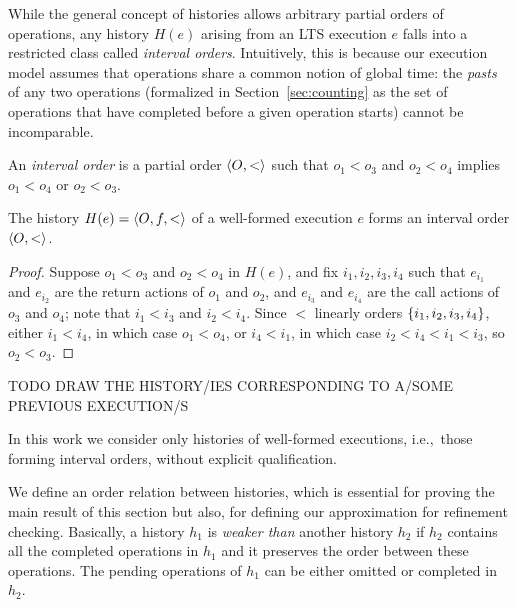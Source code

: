 While the general concept of histories allows arbitrary partial orders of
operations, any history $H(e)$ arising from an LTS execution $e$ falls into a
restricted class called \emph{interval orders}. Intuitively, this is because
our execution model assumes that operations share a common notion of global
time: the \emph{pasts} of any two operations (formalized in
Section~\ref{sec:counting} as the set of operations that have completed before
a given operation starts) cannot be incomparable.

\begin{definition}

  An \emph{interval order} is a partial order $\left\langle {O,<} \right\rangle$ such that
  $o_1 < o_3$ and $o_2 < o_4$ implies $o_1 < o_4$ or $o_2 < o_3$.

\end{definition}

\begin{lemma}
  \label{lem:intervals}

  The history $H(e) = \left\langle {O,f,<} \right\rangle$ of a well-formed execution $e$ forms an
  interval order $\left\langle {O,<} \right\rangle$.

\end{lemma}

\begin{proof}

  Suppose $o_1 < o_3$ and $o_2 < o_4$ in $H(e)$, and fix $i_1, i_2, i_3, i_4$
  such that $e_{i_1}$ and $e_{i_2}$ are the return actions of $o_1$ and $o_2$,
  and $e_{i_3}$ and $e_{i_4}$ are the call actions of $o_3$ and $o_4$; note
  that $i_1 < i_3$ and $i_2 < i_4$. Since $<$ linearly orders ${\{ i_1, i_2,
  i_3, i_4 \}}$, either $i_1 < i_4$, in which case $o_1 < o_4$, or $i_4 < i_1$, in
  which case $i_2 < i_4 < i_1 < i_3$, so $o_2 < o_3$.

\end{proof}

\begin{example}
  \label{ex:histories}

  TODO DRAW THE HISTORY/IES CORRESPONDING TO A/SOME PREVIOUS EXECUTION/S

\end{example}

\noindent
In this work we consider only histories of well-formed executions, i.e.,~those
forming interval orders, without explicit qualification.

We define an order relation between histories, which is essential for proving
the main result of this section but also, for defining our approximation for
refinement checking. Basically, a history $h_1$ is \emph{weaker than} another
history $h_2$ if $h_2$ contains all the completed operations in $h_1$ and it
preserves the order between these operations. The pending operations of $h_1$
can be either omitted or completed in $h_2$.

